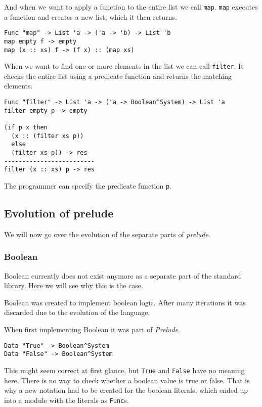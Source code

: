 And when we want to apply a function to the entire list we call \texttt{map}.
\texttt{map} executes a function and creates a new list, which it then returns.

\begin{lstlisting}
Func "map" -> List 'a -> ('a -> 'b) -> List 'b
map empty f -> empty
map (x :: xs) f -> (f x) :: (map xs)
\end{lstlisting}

When we want to find one or more elements in the list we can call \texttt{filter}.
It checks the entire list using a predicate function and returns the matching elements.

\begin{lstlisting}
Func "filter" -> List 'a -> ('a -> Boolean^System) -> List 'a
filter empty p -> empty

(if p x then
  (x :: (filter xs p))
  else
  (filter xs p)) -> res
-------------------------
filter (x :: xs) p -> res
\end{lstlisting}

The programmer can specify the predicate function \texttt{p}.


\subsection{Evolution of prelude}
We will now go over the evolution of the separate parts of \emph{prelude}.

\subsubsection{Boolean}
Boolean currently does not exist anymore as a separate part of the standard library.
Here we will see why this is the case.

Boolean was created to implement boolean logic.
After many iterations it was discarded due to the evolution of the language.

When first implementing Boolean it was part of \emph{Prelude}.

\begin{lstlisting}
Data "True" -> Boolean^System
Data "False" -> Boolean^System
\end{lstlisting}

This might seem correct at first glance, but \texttt{True} and \texttt{False} have no meaning here.
There is no way to check whether a boolean value is true or false.
That is why a new notation had to be created for the boolean literals, which ended up into a module with the literals as \texttt{Func}s.

